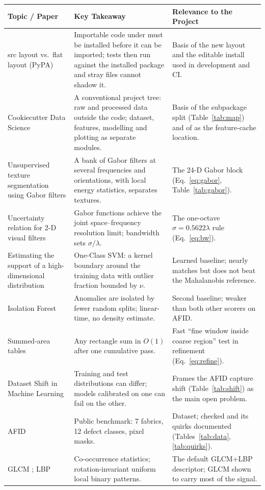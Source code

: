 \documentclass[11pt,a4paper]{article}
\newcommand{\code}[1]{\texttt{\detokenize{#1}}}
\begin{document}
\begin{center}
\small
\renewcommand{\arraystretch}{1.15}
\begin{longtable}{@{}p{}p{}p{}@{}}
\toprule
\rowcolor{hdr}\textbf{Topic / Paper} & \textbf{Key Takeaway} & \textbf{Relevance to the Project} \\
\midrule
\endhead
src layout vs.\ flat layout (PyPA) \cite{pypa} & Importable code under \code{src/} must be installed before it can be imported; tests then run against the installed package and stray files cannot shadow it. & Basis of the new \code{Codes/src/} layout and the editable install used in development and CI. \\
Cookiecutter Data Science \cite{ccds} & A conventional project tree: raw and processed data outside the code; dataset, features, modelling and plotting as separate modules. & Basis of the subpackage split (Table~\ref{tab:map}) and of \code{data/processed} as the feature-cache location. \\
Unsupervised texture segmentation using Gabor filters \cite{jain1991} & A bank of Gabor filters at several frequencies and orientations, with local energy statistics, separates textures. & The 24-D Gabor block (Eq.~\ref{eq:gabor}, Table~\ref{tab:gabor}). \\
Uncertainty relation for 2-D visual filters \cite{daugman1985} & Gabor functions achieve the joint space--frequency resolution limit; bandwidth sets $\sigma/\lambda$. & The one-octave $\sigma=0.5622\lambda$ rule (Eq.~\ref{eq:bw}). \\
Estimating the support of a high-dimensional distribution \cite{scholkopf2001} & One-Class SVM: a kernel boundary around the training data with outlier fraction bounded by $\nu$. & Learned baseline; nearly matches but does not beat the Mahalanobis reference. \\
Isolation Forest \cite{liu2008} & Anomalies are isolated by fewer random splits; linear-time, no density estimate. & Second baseline; weaker than both other scorers on AFID. \\
Summed-area tables \cite{crow1984} & Any rectangle sum in $O(1)$ after one cumulative pass. & Fast ``fine window inside coarse region'' test in refinement (Eq.~\ref{eq:refine}). \\
Dataset Shift in Machine Learning \cite{quinonero2009} & Training and test distributions can differ; models calibrated on one can fail on the other. & Frames the AFID capture shift (Table~\ref{tab:shift}) as the main open problem. \\
AFID \cite{silvestre2019} & Public benchmark: 7 fabrics, 12 defect classes, pixel masks. & Dataset; checked and its quirks documented (Tables~\ref{tab:data}, \ref{tab:quirks}). \\
GLCM \cite{haralick1973}; LBP \cite{ojala2002} & Co-occurrence statistics; rotation-invariant uniform local binary patterns. & The default GLCM+LBP descriptor; GLCM shown to carry most of the signal. \\
\bottomrule
\end{longtable}
\end{center}
\end{document}
